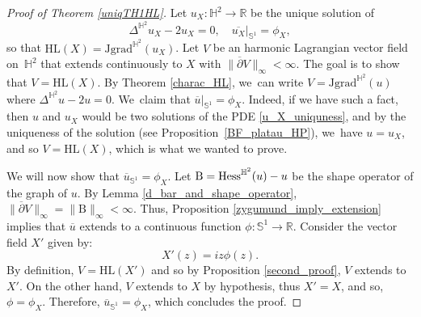 \documentclass[11pt]{article}
\makeatletter
\DeclareRobustCommand{\mathbbm}[1]{\csname jepbb@#1\endcsname}
\theoremstyle{plain}
\theoremstyle{definition}
\newcommand{\grad}{\mathrm{grad}^{\mathbb{H}^2}}
\newcommand{\hess}{\mathrm{Hess}^{\mathbb{H}^2}}
\newcommand{\J}{\mathrm{J}}
\newcommand{\B}{\mathrm{B}}
\makeatother
\begin{document}
\begin{proof}[Proof of Theorem \ref{uniqTH1HL}]
Let $u_X:\mathbb{H}^2\to\mathbb{R}$ be the unique solution of
\begin{equation}\label{u_X_uniquness}
\Delta^{\mathbb{H}^2} u_X-2u_X=0, \quad
\overline{u_X}|_{\mathbb{S}^1}=\phi_X,
\end{equation}
so that $\mathrm{HL}(X)=\J\grad(u_X)$.
Let $V$ be an harmonic Lagrangian vector field on~$\mathbb{H}^2$ that extends continuously to $X$ with $\lVert\overline{\partial}V\rVert_{\infty}\!<\! \infty$. The goal is to show that $V\!=\!\mathrm{HL}(X)$. By Theorem \ref{charac_HL}, we~can write $V=\J\grad(u)$ where $\Delta^{\mathbb{H}^2}u-2u=0$. We~claim that $\overline{u}|_{\mathbb{S}^1}=\phi_X$. Indeed, if we have such a fact, then $u$ and $u_X$ would be two solutions of the PDE \eqref{u_X_uniquness}, and by the uniqueness of the solution (see Proposition~\ref{BF_platau_HP}), we~have $u=u_X$, and so $V=\mathrm{HL}(X)$, which is what we wanted to prove.

We will now show that $\overline{u}_{\mathbb{S}^1}=\phi_X$. Let $\B=\hess(u)-u\mathbbm{1}$ be the shape operator of the graph of $u$. By Lemma \ref{d_bar_and_shape_operator}, $\lVert\overline{\partial} V\rVert_{\infty}=\lVert \B\rVert_{\infty}<\infty$. Thus, Proposition \ref{zygumund_imply_extension} implies that $\overline{u}$ extends to a continuous function $\phi:\mathbb{S}^1\to\mathbb{R}$. Consider the vector field $X'$ given by:
\[
X'(z)=iz\phi(z).
\]
By definition, $V=\mathrm{HL}(X')$ and so by Proposition \ref{second_proof}, $V$ extends to $X'$. On the other hand, $V$ extends to $X$ by hypothesis, thus $X'=X$, and so, $\phi=\phi_X$. Therefore, $\overline{u}_{\mathbb{S}^1}=\phi_X$, which concludes the proof.
\end{proof}
\end{document}
